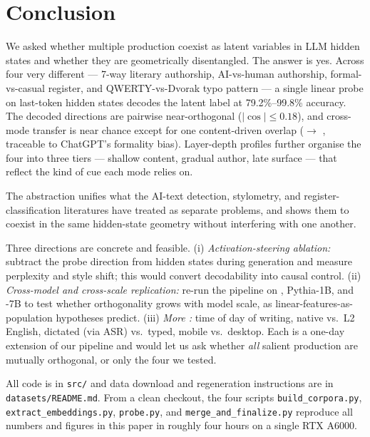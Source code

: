 \section{Conclusion}
\label{sec:conclusion}

We asked whether multiple production \modes coexist as latent variables in LLM hidden states and whether they are geometrically disentangled. The answer is yes. Across four very different \modes --- 7-way literary authorship, AI-vs-human authorship, formal-vs-casual register, and QWERTY-vs-Dvorak typo pattern --- a single linear probe on \qwen last-token hidden states decodes the latent label at 79.2\%--99.8\% accuracy. The decoded directions are pairwise near-orthogonal ($|\cos| \leq 0.18$), and cross-mode transfer is near chance except for one content-driven overlap (\register $\to$ \aihuman, traceable to ChatGPT's formality bias). Layer-depth profiles further organise the four \modes into three tiers --- shallow content, gradual author, late surface --- that reflect the kind of cue each mode relies on.

 The \modes abstraction unifies what the AI-text detection, stylometry, and register-classification literatures have treated as separate problems, and shows them to coexist in the same hidden-state geometry without interfering with one another.

 Three directions are concrete and feasible. (i) \emph{Activation-steering ablation:} subtract the \aihuman probe direction from hidden states during generation and measure perplexity and style shift; this would convert decodability into causal control. (ii) \emph{Cross-model and cross-scale replication:} re-run the pipeline on \llama, Pythia-1B, and \qwen-7B to test whether orthogonality grows with model scale, as linear-features-as-population hypotheses predict. (iii) \emph{More \modes:} time of day of writing, native vs.\ L2 English, dictated (via ASR) vs.\ typed, mobile vs.\ desktop. Each is a one-day extension of our pipeline and would let us ask whether \emph{all} salient production \modes are mutually orthogonal, or only the four we tested.

 All code is in \texttt{src/} and data download and regeneration instructions are in \texttt{datasets/README.md}. From a clean checkout, the four scripts \texttt{build\_corpora.py}, \texttt{extract\_embeddings.py}, \texttt{probe.py}, and \texttt{merge\_and\_finalize.py} reproduce all numbers and figures in this paper in roughly four hours on a single RTX A6000.
